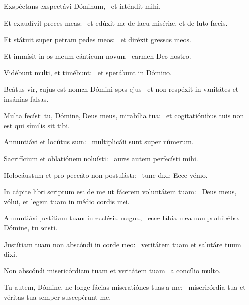 \item Exspéctans exspectávi Dóminum,~\psstar{} et inténdit mihi.

\item Et exaudívit preces meas:~\psstar{} et edúxit me de lacu misériæ, et de luto fæcis.

\item Et státuit super petram pedes meos:~\psstar{} et diréxit gressus meos.

\item Et immísit in os meum cánticum novum~\psstar{} carmen Deo nostro.

\item Vidébunt multi, et timébunt:~\psstar{} et sperábunt in Dómino.

\item Beátus vir, cujus est nomen Dómini spes ejus~\psstar{} et non respéxit in vanitátes et insánias falsas.

\item Multa fecísti tu, Dómine, Deus meus, mirabília tua:~\psstar{} et cogitatiónibus tuis non est qui símilis sit tibi.

\item Annuntiávi et locútus sum:~\psstar{} multiplicáti sunt super númerum.

\item Sacrifícium et oblatiónem noluísti:~\psstar{} aures autem perfecísti mihi.

\item Holocáustum et pro peccáto non postulásti:~\psstar{} tunc dixi: Ecce vénio.

\item In cápite libri scriptum est de me ut fácerem voluntátem tuam:~\psstar{} Deus meus, vólui, et legem tuam in médio cordis mei.

\item Annuntiávi justítiam tuam in ecclésia magna,~\psstar{} ecce lábia mea non prohibébo: Dómine, tu scisti.

\item Justítiam tuam non abscóndi in corde meo:~\psstar{} veritátem tuam et salutáre tuum dixi.

\item Non abscóndi misericórdiam tuam et veritátem tuam~\psstar{} a concílio multo.

\item Tu autem, Dómine, ne longe fácias miseratiónes tuas a me:~\psstar{} misericórdia tua et véritas tua semper suscepérunt me.

